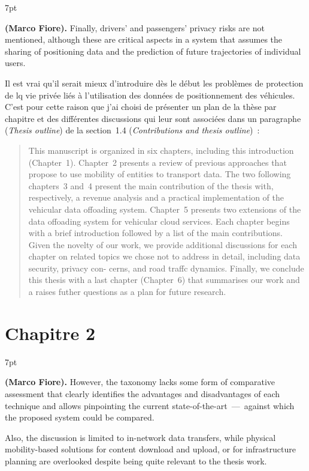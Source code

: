 \documentclass[11pt]{article}
\newenvironment{formal}{%
  \vspace*{-5pt}
  \def\FrameCommand{%
    \hspace{-5pt}%
    {\color{gray50}\vrule width 1.25pt}%
    \colorbox{formalcolor}%
  }%
  \MakeFramed{\advance\hsize-\width\FrameRestore}%
  \noindent\hspace{-4.55pt}%
  \begin{adjustwidth}{}{7pt}%
  \normalsize
  \vspace{-2pt}
}
{%
  \vspace{2pt}\end{adjustwidth}\endMakeFramed%
  \vspace*{-10pt}
}
\begin{document}
\begin{formal}
    \textbf{(Marco Fiore).} Finally, drivers’ and passengers’ privacy risks are not mentioned, although these are critical aspects in a system that assumes the sharing of positioning data and the prediction of future trajectories of individual users.
\end{formal}

Il est vrai qu'il serait mieux d'introduire dès le début les problèmes de protection de lq vie privée liés à l'utilisation des données de positionnement des véhicules. C'est pour cette raison que j'ai choisi de présenter un plan de la thèse par chapitre et des différentes discussions qui leur sont associées dans un paragraphe (\textit{Thesis outline}) de la section~1.4 (\textit{Contributions and thesis outline})~:
\begin{quote}
 This manuscript is organized in six chapters, including this introduction (Chapter~1). Chapter~2 presents a review of previous approaches that propose to use mobility of entities to transport data. The two following chapters~3 and~4 present the main contribution of the thesis with, respectively, a revenue analysis and a practical implementation of the vehicular data offoading system. Chapter~5 presents two extensions of the data offoading system for vehicular cloud services. Each chapter begins with a brief introduction followed by a list of the main contributions. Given the novelty of our work, we provide additional discussions for each chapter on related topics we chose not to address in detail, including data security, privacy con- cerns, and road traffc dynamics. Finally, we conclude this thesis with a last chapter (Chapter~6) that summarises our work and a raises futher questions as a plan for future research.
\end{quote}

\section{Chapitre 2}

\begin{formal}
    \textbf{(Marco Fiore).} However, the taxonomy lacks some form of comparative assessment that clearly identifies the advantages and disadvantages of each technique and allows pinpointing the current state-of-the-art~---~against which the proposed system could be compared.
    
    Also, the discussion is limited to in-network data transfers, while physical mobility-based solutions for content download and upload, or for infrastructure planning are overlooked despite being quite relevant to the thesis work.
\end{formal}
\end{document}
